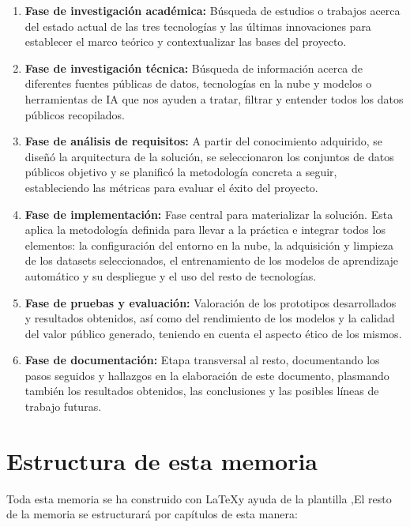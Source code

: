 \begin{enumerate}
	
	\item \textbf{Fase de investigación académica:} Búsqueda de estudios o trabajos acerca del estado actual de las tres tecnologías y las últimas innovaciones para establecer el marco teórico y contextualizar las bases del proyecto.
	
	\item \textbf{Fase de investigación técnica:} Búsqueda de información acerca de diferentes fuentes públicas de datos,  tecnologías en la nube y modelos o herramientas de IA que nos ayuden a tratar, filtrar y entender todos los datos públicos recopilados.
	
	\item \textbf{Fase de análisis de requisitos:} A partir del conocimiento adquirido, se diseñó la arquitectura de la solución, se seleccionaron los conjuntos de datos públicos objetivo y se planificó la metodología concreta a seguir, estableciendo las métricas para evaluar el éxito del proyecto.
	
	\item \textbf{Fase de implementación:} Fase central para materializar la solución. Esta aplica la metodología definida para llevar a la práctica e integrar todos los elementos: la configuración del entorno en la nube, la adquisición y limpieza de los datasets seleccionados, el entrenamiento de los modelos de aprendizaje automático y su despliegue y el uso del resto de tecnologías.
	
	\item \textbf{Fase de pruebas y evaluación:} Valoración de los prototipos desarrollados y resultados obtenidos, así como del rendimiento de los modelos y la calidad del valor público generado, teniendo en cuenta el aspecto ético de los mismos.
	
	\item \textbf{Fase de documentación:} Etapa transversal al resto, documentando los pasos seguidos y hallazgos en la elaboración de este documento, plasmando también los resultados obtenidos, las conclusiones y las posibles líneas de trabajo futuras.
\end{enumerate}

\section{Estructura de esta memoria}

Toda esta memoria se ha construido con \LaTeX\space [\ref{latexDef}] y ayuda de la plantilla \texis,\space El resto de la memoria se estructurará por capítulos de esta manera:

